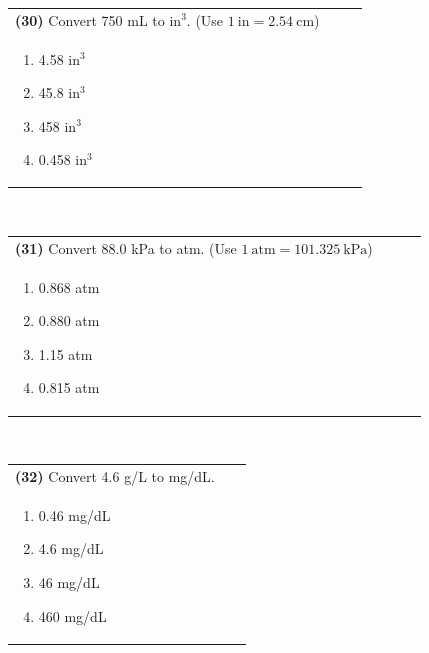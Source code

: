 \documentclass{article}
\begin{document}
\vspace{0.5cm}
\noindent \begin{tabular}{|p{0.9\linewidth}|}
\hline
\vspace{0.2cm}
\textbf{(30)} Convert 750 mL to $\text{in}^3$. (Use $1~\text{in}=2.54~\text{cm}$)\\
\begin{minipage}[t]{0.85\linewidth}
\begin{enumerate}[label=\alph*.]
   \item 4.58 $\text{in}^3$
   \item 45.8 $\text{in}^3$
   \item 458 $\text{in}^3$
   \item 0.458 $\text{in}^3$
\end{enumerate}
\end{minipage}\\
\hline
\end{tabular}
\\

\vspace{0.5cm}
\noindent \begin{tabular}{|p{0.9\linewidth}|}
\hline
\vspace{0.2cm}
\textbf{(31)} Convert 88.0 kPa to atm. (Use $1~\text{atm}=101.325~\text{kPa}$)\\
\begin{minipage}[t]{0.85\linewidth}
\begin{enumerate}[label=\alph*.]
   \item 0.868 atm
   \item 0.880 atm
   \item 1.15 atm
   \item 0.815 atm
\end{enumerate}
\end{minipage}\\
\hline
\end{tabular}
\\

\vspace{0.5cm}
\noindent \begin{tabular}{|p{0.9\linewidth}|}
\hline
\vspace{0.2cm}
\textbf{(32)} Convert 4.6 g/L to mg/dL.\\
\begin{minipage}[t]{0.85\linewidth}
\begin{enumerate}[label=\alph*.]
   \item 0.46 mg/dL
   \item 4.6 mg/dL
   \item 46 mg/dL
   \item 460 mg/dL
\end{enumerate}
\end{minipage}\\
\hline
\end{tabular}
\\
\end{document}
